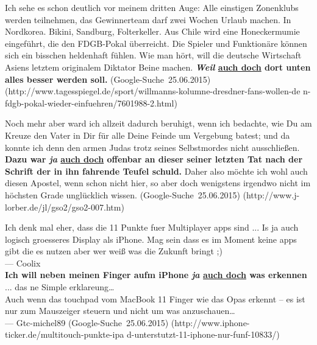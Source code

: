 {\begin{exe}
	\ex\label{1191} 
	\scriptsize
	Ich sehe es schon deutlich vor meinem dritten Auge: Alle einstigen Zonenklubs werden teilnehmen, das Gewinnerteam darf zwei Wochen Urlaub machen. In 		Nordkorea. Bikini, Sandburg, Folterkeller. Aus Chile wird eine Honeckermumie eingeführt, die den FDGB-Pokal überreicht. Die Spieler und Funktionäre 		können sich ein bisschen heldenhaft fühlen. Wie man hört, will die deutsche Wirtschaft Asiens letztem originalem Diktator Beine machen. 					\textbf{\textit{Weil} \underline{auch doch} dort unten alles besser werden soll.} 						
	\hfill\hbox{(Google-Suche 25.06.2015)}	
	\newline
	\hbox{}\hfill\hbox{(http://www.tagesspiegel.de/sport/willmanns-kolumne-dresdner-fans-wollen-de}
	\newline
	\hbox{}\hfill\hbox{n-fdgb-pokal-wieder-einfuehren/7601988-2.html)}	
\end{exe}								
						   
\begin{exe}
	\ex\label{1192} 
	\scriptsize
	Noch mehr aber ward ich allzeit dadurch beruhigt, wenn ich bedachte, wie Du am Kreuze den Vater in Dir für alle Deine Feinde um Vergebung batest; und 		da konnte ich denn den armen Judas trotz seines Selbstmordes nicht ausschließen. \textbf{Dazu war \textit{ja} \underline{auch doch} offenbar an dieser 		seiner letzten Tat nach der Schrift der in ihn fahrende Teufel schuld.} Daher also möchte ich wohl auch diesen Apostel, wenn schon nicht hier, so aber 		doch wenigstens irgendwo nicht im höchsten Grade unglücklich wissen.							
	\hfill\hbox{(Google-Suche 25.06.2015)}	
	\newline
	\hbox{}\hfill\hbox{(http://www.j-lorber.de/jl/gso2/gso2-007.htm)}
	\end{exe}						            
							           
\begin{exe}
	\ex\label{1193} 
	\scriptsize
	Ich denk mal eher, dass die 11 Punkte fuer Multiplayer apps sind ... Is ja auch logisch groesseres Display als iPhone. Mag sein dass es im Moment keine 		apps gibt die es nutzen aber wer weiß was die Zukunft bringt ;)\\
	— Coolix\\

	\textbf{Ich will neben meinen Finger aufm iPhone \textit{ja} \underline{auch doch} was erkennen} ... das ne Simple erklareung… \\
	Auch wenn das touchpad vom MacBook 11 Finger wie das Opas erkennt – es ist nur zum Mauszeiger steuern und nicht um was anzuschauen…\\
	— Gtc-michel89 								
	\hfill\hbox{(Google-Suche 25.06.2015)}	
	\newline
	\hbox{}\hfill\hbox{(http://www.iphone-ticker.de/multitouch-punkte-ipa}
	\newline
	\hbox{}\hfill\hbox{d-unterstutzt-11-iphone-nur-funf-10833/)}
\end{exe}								

}
